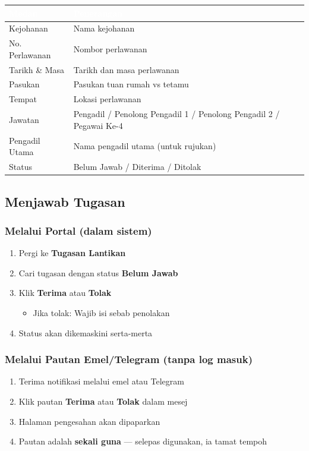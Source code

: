 \documentclass[12pt,a4paper]{report}
\newcommand{\menupath}[1]{\textcolor{pbnpblue}{\textbf{#1}}}
\newcommand{\btn}[1]{\colorbox{primaryblue!10}{\textcolor{primaryblue}{\textbf{#1}}}}
\newcommand{\status}[2]{\colorbox{#1!15}{\textcolor{#1}{\small\textbf{#2}}}}
\begin{document}
\begin{table}[H]
\centering
{}
\begin{tabularx}{\textwidth}{l X}
\toprule
\rowcolor{tableheader}
\textcolor{white}{\textbf{Medan}} & \textcolor{white}{\textbf{Penerangan}} \\
\midrule
Kejohanan & Nama kejohanan \\
No. Perlawanan & Nombor perlawanan \\
Tarikh \& Masa & Tarikh dan masa perlawanan \\
Pasukan & Pasukan tuan rumah vs tetamu \\
Tempat & Lokasi perlawanan \\
Jawatan & Pengadil / Penolong Pengadil 1 / Penolong Pengadil 2 / Pegawai Ke-4 \\
Pengadil Utama & Nama pengadil utama (untuk rujukan) \\
Status & Belum Jawab / Diterima / Ditolak \\
\bottomrule
\end{tabularx}
\end{table}

\subsection{Menjawab Tugasan}

\subsubsection{Melalui Portal (dalam sistem)}
\begin{enumerate}[label=\textcolor{pbnpblue}{\textbf{\arabic*.}}, leftmargin=2em]
  \item Pergi ke \menupath{Tugasan Lantikan}
  \item Cari tugasan dengan status \status{warningyellow}{Belum Jawab}
  \item Klik \btn{Terima} atau \btn{Tolak}
    \begin{itemize}
      \item Jika tolak: Wajib isi sebab penolakan
    \end{itemize}
  \item Status akan dikemaskini serta-merta
\end{enumerate}

\subsubsection{Melalui Pautan Emel/Telegram (tanpa log masuk)}
\begin{enumerate}[label=\textcolor{pbnpblue}{\textbf{\arabic*.}}, leftmargin=2em]
  \item Terima notifikasi melalui emel atau Telegram
  \item Klik pautan \btn{Terima} atau \btn{Tolak} dalam mesej
  \item Halaman pengesahan akan dipaparkan
  \item Pautan adalah \textbf{sekali guna} --- selepas digunakan, ia tamat tempoh
\end{enumerate}
\end{document}
